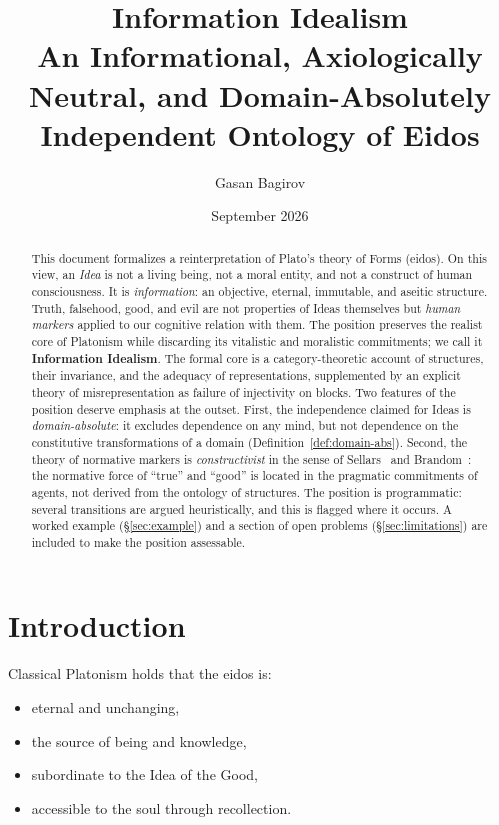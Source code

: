 \documentclass[11pt,a4paper]{article}
\title{\textbf{Information Idealism}\\[0.3em]
\large An Informational, Axiologically Neutral, and Domain-Absolutely
Independent Ontology of Eidos}
\author{Gasan Bagirov}
\date{September 2026}
\theoremstyle{definition}
\theoremstyle{remark}
\begin{document}
\maketitle

\begin{abstract}
\noindent
This document formalizes a reinterpretation of Plato's theory of Forms
(eidos). On this view, an \emph{Idea} is not a living being, not a moral
entity, and not a construct of human consciousness. It is
\emph{information}: an objective, eternal, immutable, and aseitic
structure. Truth, falsehood, good, and evil are not properties of Ideas
themselves but \emph{human markers} applied to our cognitive relation
with them. The position preserves the realist core of Platonism while
discarding its vitalistic and moralistic commitments; we call it
\textbf{Information Idealism}. The formal core is a category-theoretic
account of structures, their invariance, and the adequacy of
representations, supplemented by an explicit theory of
misrepresentation as failure of injectivity on blocks. Two features of
the position deserve emphasis at the outset. First, the independence
claimed for Ideas is \emph{domain-absolute}: it excludes dependence on
any mind, but not dependence on the constitutive transformations of a
domain (Definition~\ref{def:domain-abs}). Second, the theory of
normative markers is \emph{constructivist} in the sense of
Sellars~\cite{Sellars1956} and Brandom~\cite{Brandom1994}: the
normative force of ``true'' and ``good'' is located in the pragmatic
commitments of agents, not derived from the ontology of structures. The
position is programmatic: several transitions are argued
heuristically, and this is flagged where it occurs. A worked example
(\S\ref{sec:example}) and a section of open problems
(\S\ref{sec:limitations}) are included to make the position
assessable.
\end{abstract}

\section{Introduction}

Classical Platonism holds that the eidos is:
\begin{itemize}[nosep]
  \item eternal and unchanging,
  \item the source of being and knowledge,
  \item subordinate to the Idea of the Good,
  \item accessible to the soul through recollection.
\end{itemize}
\end{document}
